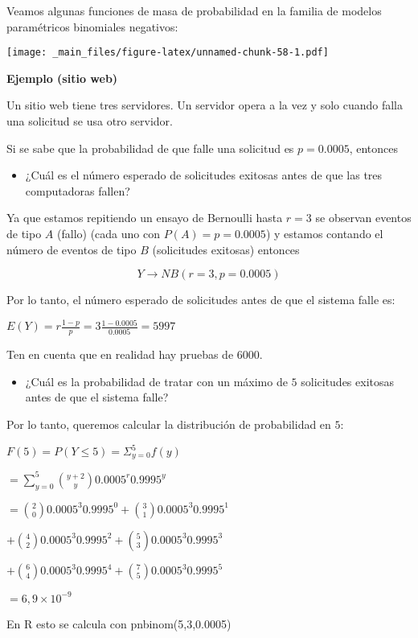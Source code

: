 \documentclass[
]{book}
\providecommand{\tightlist}{%
  \setlength{\itemsep}{0pt}\setlength{\parskip}{0pt}}
\begin{document}
Veamos algunas funciones de masa de probabilidad en la familia de modelos paramétricos binomiales negativos:

\texttt{[image: \_main\_files/figure-latex/unnamed-chunk-58-1.pdf]}

\textbf{Ejemplo (sitio web)}

Un sitio web tiene tres servidores. Un servidor opera a la vez y solo cuando falla una solicitud se usa otro servidor.

Si se sabe que la probabilidad de que falle una solicitud es \(p=0.0005\), entonces

\begin{itemize}
\tightlist
\item
  ¿Cuál es el número esperado de solicitudes exitosas antes de que las tres computadoras fallen?
\end{itemize}

Ya que estamos repitiendo un ensayo de Bernoulli hasta \(r=3\) se observan eventos de tipo \(A\) (fallo) (cada uno con \(P(A)=p=0.0005\)) y estamos contando el número de eventos de tipo \(B\) (solicitudes exitosas) entonces

\[Y \rightarrow NB(r=3, p=0.0005)\]

Por lo tanto, el número esperado de solicitudes antes de que el sistema falle es:

\(E(Y)=r\frac{1-p}{p}=3\frac{1-0.0005}{0.0005}=5997\)

Ten en cuenta que en realidad hay pruebas de \(6000\).

\begin{itemize}
\tightlist
\item
  ¿Cuál es la probabilidad de tratar con un máximo de \(5\) solicitudes exitosas antes de que el sistema falle?
\end{itemize}

Por lo tanto, queremos calcular la distribución de probabilidad en \(5\):

\(F(5)=P(Y\leq 5)=\Sigma_{y=0}^5 f(y)\)

\(=\sum_{y=0}^5\binom {y+2} y 0.0005^r0.9995^y\)

\(=\binom{2} 0 0.0005^3 0.9995^0 +\binom{3} 1 0.0005^3 0.9995^1\)

\(+\binom {4} 2 0.0005^3 0.9995^2 +\binom {5} 3 0.0005^3 0.9995^3\)

\(+\binom {6} 4 0.0005^3 0.9995^4 +\binom {7} 5 0.0005^3 0.9995^5\)

\(= 6,9\times 10^{-9}\)

En R esto se calcula con pnbinom(5,3,0.0005)
\end{document}
